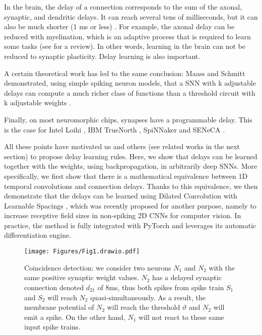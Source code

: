 \documentclass{article} \usepackage{iclr2024_conference,times}
\begin{document}
In the brain, the delay of a connection corresponds to the sum of the axonal, synaptic, and dendritic delays. It can reach several tens of milliseconds, but it can also be much shorter (1 ms or less) \citep{Izhikevich2006}. For example, the axonal delay can be reduced with myelination, which is an adaptive process that is required to learn some tasks (see \citet{Bowers2017a} for a review). In other words, learning in the brain can not be reduced to synaptic plasticity. Delay learning is also important.

A certain theoretical work has led to the same conclusion: Maass and Schmitt demonstrated, using simple spiking neuron models, that a SNN with k adjustable delays can compute a much richer class of functions than a threshold circuit with k adjustable weights \citep{Maass1999}.

Finally, on most neuromorphic chips, synapses have a programmable delay. This is the case for Intel Loihi \citep{Davies2018}, IBM TrueNorth \citep{Akopyan2015}, SpiNNaker \citep{Furber2014} and SENeCA \citep{Yousefzadeh2022}.

All these points have motivated us and others (see related works in the next section) to propose delay learning rules. Here, we show that delays can be learned together with the weights, using backpropagation, in arbitrarily deep SNNs. More specifically, we first show that there is a mathematical equivalence between 1D temporal convolutions and connection delays. Thanks to this equivalence, we then demonstrate that the delays can be learned using Dilated Convolution with Learnable Spacings \citep{hassani2023dilated, khalfaouihassani2023dilated}, which was recently proposed for another purpose, namely to increase receptive field sizes in non-spiking 2D CNNs for computer vision. In practice, the method is fully integrated with PyTorch and leverages its automatic differentiation engine.

\begin{figure}[ht]
  \centering
  \texttt{[image: Figures/Fig1.drawio.pdf]}
  \caption{Coincidence detection: we consider two neurons $N_1$ and $N_2$ with the same positive synaptic weight values. $N_2$ has a delayed synaptic connection denoted $d_{21}$ of $8$ms, thus both spikes from spike train $S_1$ and $S_2$ will reach $N_2$ quasi-simultaneously. As a result, the membrane potential of $N_2$ will reach the threshold $\vartheta$ and $N_2$ will emit a spike. On the other hand, $N_1$ will not react to these same input spike trains. }
\label{fig:coincidence_detection}
\end{figure}
\end{document}
